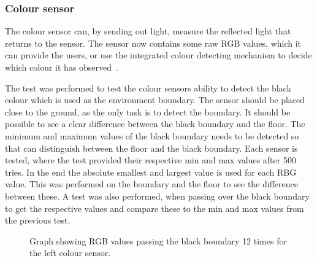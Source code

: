 \subsubsection{Colour sensor} \label{sec:colour_sensor} 
The colour sensor can, by sending out light, measure the reflected light that returns to the sensor. The sensor now contains some raw RGB values, which it can provide the users, or use the integrated colour detecting mechanism to decide which colour it has observed~\citep{lego_education}. 

The test was performed to test the colour sensors ability to detect the black colour which is used as the environment boundary. The sensor should be placed close to the ground, as the only task is to detect the boundary. It should be possible to see a clear difference between the black boundary and the floor. The minimum and maximum values of the black boundary needs to be detected so that \projname{} can distinguish between the floor and the black boundary. Each sensor is tested, where the test provided their respective min and max values after 500 tries. In the end the absolute smallest and largest value is used for each RBG value. This was performed on the boundary and the floor to see the difference between these. A test was also performed, when passing over the black boundary to get the respective values and compare these to the min and max values from the previous test.

\begin{figure}[H]
     \caption{\label{fig:colour_sensor_test_left} Graph showing RGB values passing the black boundary 12 times for the left colour sensor.}
\end{figure}

